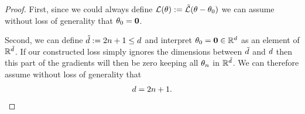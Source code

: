 \begin{proof}
	First, since we could always define
	\(\mathcal{L}(\theta):=\tilde{\mathcal{L}}(\theta-\theta_0)\)
	we can assume without loss of generality that \(\theta_0=\mathbf{0}\). 
	
	Second, we can define \(\tilde{d} := 2n +1 \le d	\)	
	and interpret \(\theta_0 = \mathbf{0} \in\mathbb{R}^d\) as an element of
	\(\mathbb{R}^{\tilde{d}}\). If our constructed loss simply
	ignores the dimensions between \(\tilde{d}\) and \(d\) then
	this part of the gradients will then be zero keeping all \(\theta_n\) in
	\(\mathbb{R}^{\tilde{d}}\). We can therefore assume without loss of
	generality that 
	\begin{align}\label{eq: w.l.o.g dim=2n+1}
		d=2n+1.
	\end{align}


\end{proof}
